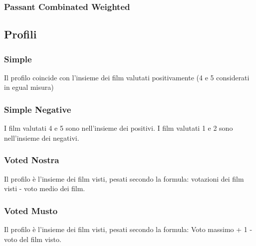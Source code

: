 \subsubsection{Passant Combinated Weighted}

\lipsum



\subsection{Profili}

\subsubsection{Simple}
Il profilo coincide con l'insieme dei film valutati positivamente (4 e 5 considerati in egual misura)

\subsubsection{Simple Negative}

I film valutati 4 e 5 sono nell'insieme dei positivi. I film valutati 1 e 2 sono nell'insieme dei negativi.


\subsubsection{Voted Nostra}


Il profilo è l'insieme dei film visti, pesati secondo la formula:
votazioni dei film visti - voto medio dei film.

\subsubsection{Voted Musto}

Il profilo è l'insieme dei film visti, pesati secondo la formula:
Voto massimo + 1 - voto del film visto. 

